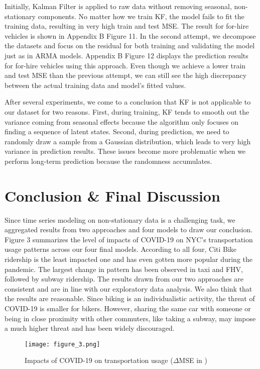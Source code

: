 \documentclass{article}
\begin{document}
Initially, Kalman Filter is applied to raw data without removing seasonal, non-stationary components. No matter how we train KF, the model fails to fit the training data, resulting in very high train and test MSE. The result for for-hire vehicles is shown in Appendix B Figure 11.
In the second attempt, we decompose the datasets and focus on the residual for both training and validating the model just as in ARMA models. Appendix B Figure 12 displays the prediction results for for-hire vehicles using this approach. Even though we achieve a lower train and test MSE than the previous attempt, we can still see the high discrepancy between the actual training data and model’s fitted values.

After several experiments, we come to a conclusion that KF is not applicable to our dataset for two reasons. First, during training, KF tends to smooth out the variance coming from seasonal effects because the algorithm only focuses on finding a sequence of latent states. Second, during prediction, we need to randomly draw a sample from a Gaussian distribution, which leads to very high variance in prediction results. These issues become more problematic when we perform long-term prediction because the randomness accumulates.

\section{Conclusion \& Final Discussion}

Since time series modeling on non-stationary data is a challenging task, we aggregated results from two approaches and four models to draw our conclusion. Figure 3 summarizes the level of impacts of COVID-19 on NYC’s transportation usage patterns across our four final models. According to all four, Citi Bike ridership is the least impacted one and has even gotten more popular during the pandemic. The largest change in pattern has been observed in taxi and FHV, followed by subway ridership. The results drawn from our two approaches are consistent and are in line with our exploratory data analysis. We also think that the results are reasonable. Since biking is an individualistic activity, the threat of COVID-19 is smaller for bikers. However, sharing the same car with someone or being in close proximity with other commuters, like taking a subway, may impose a much higher threat and has been widely discouraged. 

\begin{figure}[h]
  \centering
  \texttt{[image: figure\_3.png]}
  \caption{Impacts of COVID-19 on transportation usage ($\Delta$MSE  in \textperthousand)}

\end{figure}
\end{document}
